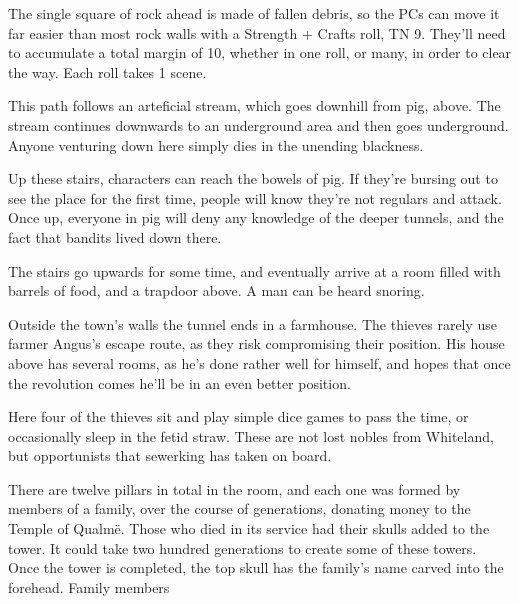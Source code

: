 \begin{multicols}{2}
The single square of rock ahead is made of fallen debris, so the PCs can move it far easier than most rock walls with a Strength + Crafts roll, TN 9.  They'll need to accumulate a total margin of 10, whether in one roll, or many, in order to clear the way.  Each roll takes 1 scene.

\label{pigexit}

\label{slidein}

This path follows an arteficial stream, which goes downhill from \gls{pig}, above.  The stream continues downwards to an underground area and then goes underground.  Anyone venturing down here simply dies in the unending blackness.



Up these stairs, characters can reach the bowels of \gls{pig}.  If they're bursing out to see the place for the first time, people will know they're not regulars and attack.  Once up, everyone in \gls{pig} will deny any knowledge of the deeper tunnels, and the fact that bandits lived down there.


\begin{boxtext}

	The stairs go upwards for some time, and eventually arrive at a room filled with barrels of food, and a trapdoor above.  A man can be heard snoring.

\end{boxtext}

Outside the town's walls the tunnel ends in a farmhouse.  The thieves rarely use farmer Angus's escape route, as they risk compromising their position.  His house above has several rooms, as he's done rather well for himself, and hopes that once the revolution comes he'll be in an even better position.


Here four of the thieves sit and play simple dice games to pass the time, or occasionally sleep in the fetid straw.  These are not lost nobles from Whiteland, but opportunists that \gls{sewerking} has taken on board.


\humanthief


There are twelve pillars in total in the room, and each one was formed by members of a family, over the course of generations, donating money to the Temple of Qualm\"{e}.  Those who died in its service had their skulls added to the tower.  It could take two hundred generations to create some of these towers.  Once the tower is completed, the top skull has the family's name carved into the forehead.  Family members


\end{multicols}
